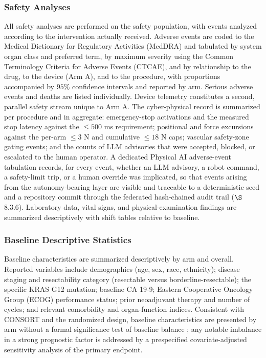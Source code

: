 \clearpage

\subsubsection{Safety Analyses}

All safety analyses are performed on the safety population, with events analyzed
according to the intervention actually received. Adverse events are coded to the
Medical Dictionary for Regulatory Activities (MedDRA) and tabulated by system organ
class and preferred term, by maximum severity using the Common Terminology Criteria
for Adverse Events (CTCAE), and by relationship to the drug, to the device (Arm A),
and to the procedure, with proportions accompanied by $95\%$ confidence intervals and
reported by arm. Serious adverse events and deaths are listed individually. Device
telemetry constitutes a second, parallel safety stream unique to Arm A. The
cyber-physical record is summarized per procedure and in aggregate: emergency-stop
activations and the measured stop latency against the $\leq 500$ ms requirement;
positional and force excursions against the per-arm $\leq 3$ N and cumulative
$\leq 18$ N caps; vascular safety-zone gating events; and the counts of LLM
advisories that were accepted, blocked, or escalated to the human operator. A
dedicated Physical AI adverse-event tabulation records, for every event, whether an
LLM advisory, a robot command, a safety-limit trip, or a human override was
implicated, so that events arising from the autonomy-bearing layer are visible and
traceable to a deterministic seed and a repository commit through the federated
hash-chained audit trail ($\S$8.3.6). Laboratory data, vital signs, and
physical-examination findings are summarized descriptively with shift tables relative
to baseline.

\subsubsection{Baseline Descriptive Statistics}

Baseline characteristics are summarized descriptively by arm and overall. Reported
variables include demographics (age, sex, race, ethnicity); disease staging and
resectability category (resectable versus borderline-resectable); the specific KRAS
G12 mutation; baseline CA 19-9; Eastern Cooperative Oncology Group (ECOG) performance
status; prior neoadjuvant therapy and number of cycles; and relevant comorbidity and
organ-function indices. Consistent with CONSORT and the randomized design, baseline
characteristics are presented by arm without a formal significance test of baseline
balance \cite{Schulz2010consort}; any notable imbalance in a strong prognostic factor
is addressed by a prespecified covariate-adjusted sensitivity analysis of the primary
endpoint.

